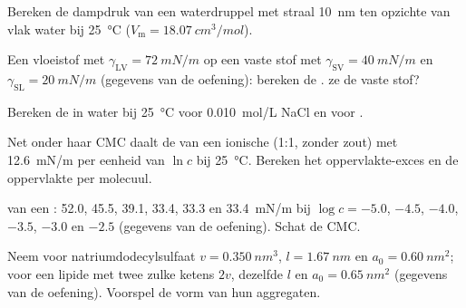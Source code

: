 \begin{exercise}[$\star$]\label{exo:b3:colloids:2}
Bereken de dampdruk van een waterdruppel met straal \qty{10}{nm} ten
opzichte van vlak water bij \qty{25}{\celsius} ($V_{\mathrm m} = \qty{18.07}{cm^3/mol}$).
\end{exercise}

\begin{exercise}[$\star$]\label{exo:b3:colloids:3}
Een vloeistof met $\gamma_{\mathrm{LV}} = \qty{72}{mN/m}$ op een vaste stof met $\gamma_{\mathrm{SV}} = \qty{40}{mN/m}$ en $\gamma_{\mathrm{SL}} =
\qty{20}{mN/m}$ (gegevens van de oefening): bereken de .
 ze de vaste stof?
\end{exercise}

\begin{exercise}[$\star$]\label{exo:b3:colloids:4}
Bereken de  in water bij \qty{25}{\celsius} voor \qty{0.010}{mol/L} NaCl en voor
.
\end{exercise}

\begin{exercise}[$\star\star$]\label{exo:b3:colloids:5}
Net onder haar CMC daalt de  van een ionische
 (1:1, zonder zout) met \qty{12.6}{mN/m} per eenheid van $\ln c$ bij \qty{25}{\celsius}. Bereken het
oppervlakte-exces en de oppervlakte per molecuul.
\end{exercise}

\begin{exercise}[$\star\star$]\label{exo:b3:colloids:6}
 van een : 52.0,
45.5, 39.1, 33.4, 33.3 en
\qty{33.4}{mN/m} bij $\log c = -5.0$, $-4.5$, $-4.0$, $-3.5$, $-3.0$ en $-2.5$ (gegevens van de oefening).
Schat de CMC.
\end{exercise}

\begin{exercise}[$\star\star$]\label{exo:b3:colloids:7}
Neem voor natriumdodecylsulfaat $v = \qty{0.350}{nm^3}$, $l = \qty{1.67}{nm}$ en $a_0 = \qty{0.60}{nm^2}$; voor een
lipide met twee zulke ketens $2v$, dezelfde $l$ en $a_0 = \qty{0.65}{nm^2}$ (gegevens van de
oefening). Voorspel de vorm van hun aggregaten.
\end{exercise}

